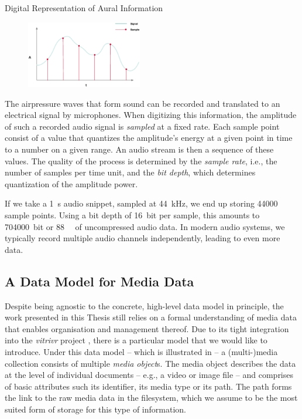 \begin{example}[label=example:representation_audio_information]{Digital Representation of Aural Information}{}
    \begin{figure}
        \includegraphics[width=0.45\textwidth]{figures/example-audio-signal.eps}
    \end{figure}
    The airpressure waves that form sound can be recorded and translated to an electrical signal by microphones. When digitizing this information, the amplitude of such a recorded audio signal is \emph{sampled} at a fixed rate. Each sample point consist of a value that quantizes the amplitude's energy at a given point in time to a number on a given range. An audio stream is then a sequence of these values. The quality of the process is determined by the \emph{sample rate}, i.e., the number of samples per time unit, and the \emph{bit depth}, which determines quantization of the amplitude power.

    If we take a \SI{1}{\second} audio snippet, sampled at \SI{44}{\kilo\hertz}, we end up storing \num{44000} sample points. Using a bit depth of \SI{16}{bit} per sample, this amounts to \SI{704000}{bit} or \SI{88}{\kilo\byte} of uncompressed audio data. In modern audio systems, we typically record multiple audio channels independently, leading to even more data.
\end{example}

\subsection{A Data Model for Media Data}
\label{section:media_data_model}
Despite being agnostic to the concrete, high-level data model in principle, the work presented in this Thesis still relies on a formal understanding of media data that enables organisation and management thereof. Due to its tight integration into the \emph{vitrivr} project \cite{Rossetto:2016vitrivr,Gasser:2019multimodal,Heller:2020multi}, there is a particular model that we would like to introduce. Under this data model -- which is illustrated in  -- a (multi-)media collection consists of multiple \emph{media object}s. The media object describes the data at the level of individual documents -- e.g., a video or image file -- and comprises of basic attributes such its identifier, its media type or its path. The path forms the link to the raw media data in the filesystem, which we assume to be the most suited form of storage for this type of information. 

